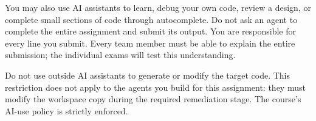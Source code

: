 \documentclass[9pt,letterpaper]{article}
\begin{document}
You may also use AI assistants to learn, debug your own code, review a design, or
complete small sections of code through autocomplete. Do not ask an agent to
complete the entire assignment and submit its output. You are responsible for
every line you submit. Every team member must be able to explain the entire
submission; the individual exams will test this understanding.

Do not use outside AI assistants to generate or modify the target code. This
restriction does not apply to the agents you build for this assignment: they
must modify the workspace copy during the required remediation stage. The
course's AI-use policy is strictly enforced.
\end{document}
